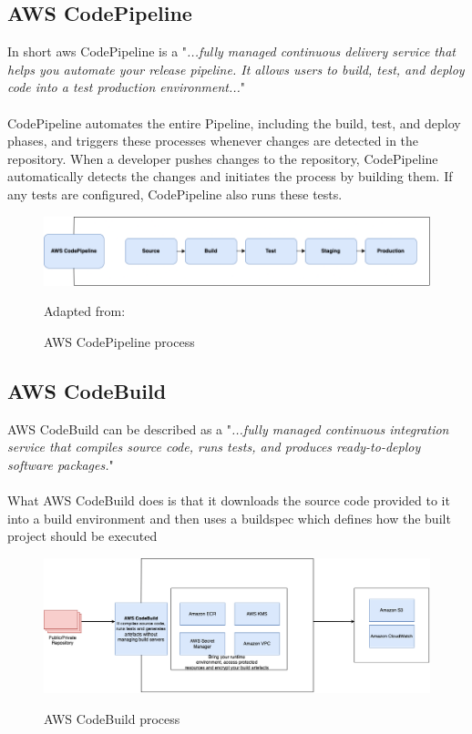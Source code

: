 \subsection{AWS CodePipeline}
In short \acrshort{aws} CodePipeline is a "\textit{...fully managed continuous delivery service that helps you automate your release pipeline. It allows users to build, test, and deploy code into a test production environment...}"
\cite{AWSCodePipeline}
\\~\\
CodePipeline automates the entire \gls{Pipeline}, including the build, test, and deploy phases, and triggers these processes whenever changes are detected in the repository. When a developer pushes changes to the repository, CodePipeline automatically detects the changes and initiates the process by building them. If any tests are configured, CodePipeline also runs these tests.\cite{AWSCodePipeline1}
\begin{figure}[H]
    \centering
    \includegraphics[scale=0.4]{Images/CodePipeline.png}
    \caption{AWS CodePipeline process}Adapted from: \cite{AWSCodePipeline2}
    \label{fig: AWS CodePipeline Process}
\end{figure}

\subsection{AWS CodeBuild }
AWS CodeBuild can be described as a "\textit{...fully managed continuous integration service that compiles source code, runs tests, and produces ready-to-deploy software packages.}"
\cite{AWSCodeBuild}
\\~\\
What AWS CodeBuild does is that it downloads the source code provided to it into a build environment and then uses a \Gls{buildspec} which defines how the built project should be executed\cite{AWSCodeBuild1}
\begin{figure}[H]
    \centering
    \includegraphics[scale=0.4]{Images/CodeBuild.png}
    \caption{AWS CodeBuild process}\cite{AWSCodeBuild}
    \label{fig: AWS CodeBuild Process}
\end{figure}

